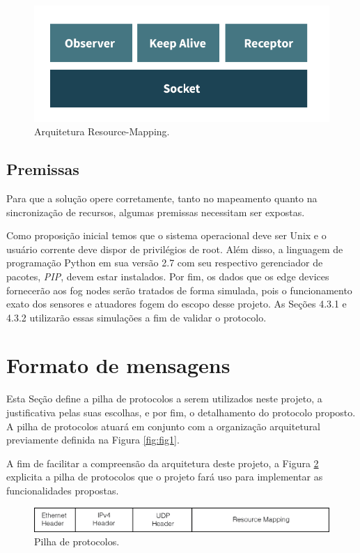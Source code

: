 \begin{figure}[H]
    \centering\includegraphics[width=.5\textwidth]{fig16.png}
    \caption[Arquitetura Resource-Mapping]
    {\label{fig:fig16} Arquitetura Resource-Mapping.}
\end{figure}


\subsection{Premissas}

Para que a solução opere corretamente, tanto no mapeamento quanto na sincronização de recursos, algumas premissas necessitam ser expostas.

Como proposição inicial temos que o sistema operacional deve ser Unix e o usuário corrente deve dispor de privilégios de root.
Além disso, a linguagem de programação Python em sua versão 2.7 com seu respectivo gerenciador de pacotes, \textit{PIP}\cite{pip}, devem estar instalados.
Por fim, os dados que os edge devices fornecerão aos fog nodes serão tratados de forma simulada, pois o funcionamento exato dos sensores e atuadores
fogem do escopo desse projeto. As Seções 4.3.1 e 4.3.2 utilizarão essas simulações a fim de validar o protocolo.


\section{Formato de mensagens}

Esta Seção define a pilha de protocolos a serem utilizados neste projeto, a justificativa pelas suas escolhas, e por fim, o detalhamento do protocolo proposto.
A pilha de protocolos atuará em conjunto com a organização arquitetural previamente definida na Figura \ref{fig:fig1}.

A fim de facilitar a compreensão da arquitetura deste projeto, a Figura \ref{fig:fig2} explicita a pilha de protocolos que o projeto fará uso para implementar as funcionalidades propostas.

\begin{figure}[htb!]
    \centering\includegraphics[width=.8\textwidth]{fig2.png}
    \caption[Pilha de protocolos]
    {\label{fig:fig2} Pilha de protocolos.}
\end{figure}

